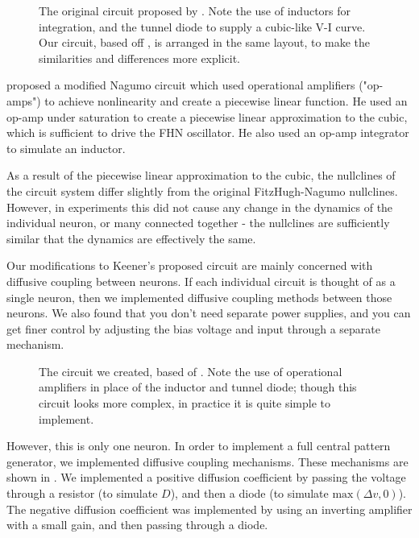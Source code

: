 \documentclass[
    11pt,
]{article}
\begin{document}
\begin{figure}[h!]
    \centering
    \caption{The original circuit proposed by \citet{nagumo1962}.  Note the use of inductors for integration, and the tunnel diode to supply a cubic-like V-I curve.  Our circuit, based off \citet{keener1983}, is arranged in the same layout, to make the similarities and differences more explicit.}
    \label{fig: nagumo_ckt}
\end{figure}

\citet{keener1983} proposed a modified Nagumo circuit which used operational amplifiers ("op-amps") to achieve nonlinearity and create a piecewise linear function.  He used an op-amp under saturation to create a piecewise linear approximation to the cubic, which is sufficient to drive the FHN oscillator.  He also used an op-amp integrator to simulate an inductor.

As a result of the piecewise linear approximation to the cubic, the nullclines of the circuit system differ slightly from the original FitzHugh-Nagumo nullclines.  However, in experiments this did not cause any change in the dynamics of the individual neuron, or many connected together - the nullclines are sufficiently similar that the dynamics are effectively the same.

Our modifications to Keener's proposed circuit are mainly concerned with diffusive coupling between neurons.  If each individual circuit is thought of as a single neuron, then we implemented diffusive coupling methods between those neurons.  We also found that you don't need separate power supplies, and you can get finer control by adjusting the bias voltage and input through a separate mechanism.

\begin{figure}[h!]
    \centering
    \caption{The circuit we created, based of \citet{keener1983}.  Note the use of operational amplifiers in place of the inductor and tunnel diode; though this circuit looks more complex, in practice it is quite simple to implement.}
    \label{fig: neuron_unit}
\end{figure}

However, this is only one neuron.  In order to implement a full central pattern generator, we implemented diffusive coupling mechanisms.  These mechanisms are shown in .  We implemented a positive diffusion coefficient by passing the voltage through a resistor (to simulate $D$), and then a diode (to simulate $\mathrm{max}(\Delta v, 0)$).  The negative diffusion coefficient was implemented by using an inverting amplifier with a small gain, and then passing through a diode.
\end{document}
